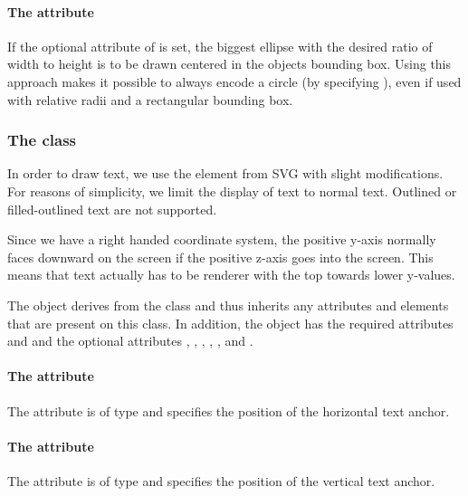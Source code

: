 \paragraph{The \fixttspace{} attribute}
If the optional  attribute of  is set, the biggest 
ellipse with the desired ratio of width to height is to be drawn centered in the 
objects bounding box. Using this approach makes it possible to always encode a 
circle (by specifying ), even if used with relative radii and a
rectangular bounding box. 

\subsubsection{The  class}
\label{text-class}

In order to draw text, we use the  element from SVG with slight 
modifications. For reasons of simplicity, we limit the display of text to normal 
text. Outlined or filled-outlined text are not supported.

Since we have a right handed coordinate system, the positive y-axis normally 
faces downward on the screen if the positive z-axis goes into the screen. This 
means that text actually has to be renderer with the top towards lower y-values.


The \Text object derives from the \GraphicalPrimitiveOneD class and thus
inherits any attributes and elements that are present on this class.
In addition, the \Text object has the required attributes  and  
and the optional attributes , , , 
, ,  and 
.

\paragraph{The \fixttspace{} attribute}

The  attribute is of type
\RelAbsVector and specifies the position of the horizontal text anchor.

\paragraph{The \fixttspace{} attribute}

The  attribute is of type
\RelAbsVector and specifies the position of the vertical text anchor.

